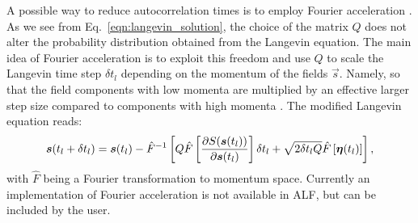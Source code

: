 A possible way to reduce autocorrelation times is to employ Fourier acceleration \cite{Batrouni85,Batrouni19}. As we see from Eq.~\eqref{eqn:langevin_solution}, the choice of the matrix $Q$ does not alter the probability distribution obtained from the Langevin equation. The main idea of Fourier acceleration is to exploit this freedom and use $Q$ to scale the Langevin time step $\delta t_l$ depending on the momentum of the fields $\vec{s}$. Namely, so that the field components with low momenta are multiplied by an effective larger step size compared to components with high momenta \cite{Davies86}. The modified Langevin equation reads:
\begin{equation}
   \boldsymbol{s}(t_{l} +  \delta t_{l})    =    \boldsymbol{s}(t_{l})    - \hat{F}^{-1} \left[ Q \hat{F}\left[\frac{\partial S( \boldsymbol{s}(t_{l})) }{\partial    \boldsymbol{s}(t_{l}) } \right]   \delta t_{l}     +\sqrt{2 \delta t_{l} Q} \hat{F}\left[\boldsymbol{\eta}(t_{l})\right] \right],
\end{equation}
with $\hat{F}$ being a Fourier transformation to momentum space. Currently an implementation of Fourier acceleration is not available in ALF, but can be included by the user.

